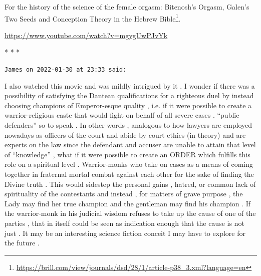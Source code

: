 For the history of the science of the female orgasm: Bitenosh's Orgasm, Galen's Two Seeds and Conception Theory in the Hebrew Bible\footnote{\url{https://brill.com/view/journals/dsd/28/1/article-p38\_3.xml?language=en}}.

\url{https://www.youtube.com/watch?v=mgygUwPJvYk} 


\begin{center}* * *\end{center}

\begin{footnotesize}
\begin{sffamily}
\texttt{James on 2022-01-30 at 23:33 said:}

I also watched this movie and was mildly intrigued by it . I wonder if there was a possibility of satisfying the Dantean qualifications for a righteous duel by instead choosing champions of Emperor-esque quality , i.e. if it were possible to create a warrior-religious caste that would fight on behalf of all severe cases . ``public defenders'' so to speak . In other words , analogous to how lawyers are employed nowadays as officers of the court and abide by court ethics (in theory) and are experts on the law since the defendant and accuser are unable to attain that level of ``knowledge'' , what if it were possible to create an ORDER which fulfills this role on a spiritual level . Warrior-monks who take on cases as a means of coming together in fraternal mortal combat against each other for the sake of finding the Divine truth . This would sidestep the personal gains , hatred, or common lack of spirituality of the contestants and instead , for matters of grave purpose , the Lady may find her true champion and the gentleman may find his champion . If the warrior-monk in his judicial wisdom refuses to take up the cause of one of the parties , that in itself could be seen as indication enough that the cause is not just . It may be an interesting science fiction conceit I may have to explore for the future .

\end{sffamily}
\end{footnotesize}

